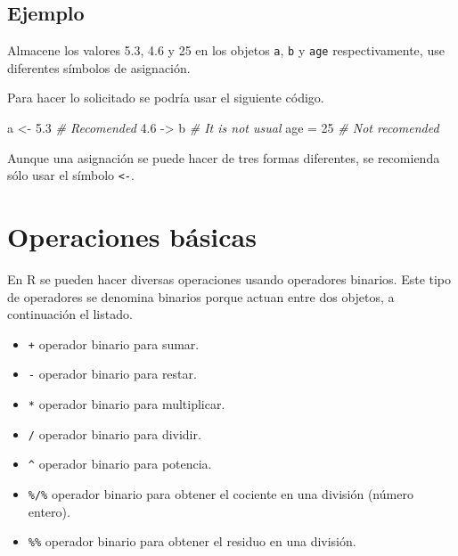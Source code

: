 \documentclass[10pt,]{krantz}
\makeatletter
\newenvironment{Shaded}{\begin{snugshade}}{\end{snugshade}}
\newcommand{\DecValTok}[1]{\textcolor[rgb]{0.00,0.00,0.81}{#1}}
\newcommand{\FloatTok}[1]{\textcolor[rgb]{0.00,0.00,0.81}{#1}}
\newcommand{\StringTok}[1]{\textcolor[rgb]{0.31,0.60,0.02}{#1}}
\newcommand{\CommentTok}[1]{\textcolor[rgb]{0.56,0.35,0.01}{\textit{#1}}}
\newcommand{\NormalTok}[1]{#1}
\providecommand{\tightlist}{%
  \setlength{\itemsep}{0pt}\setlength{\parskip}{0pt}}
\newenvironment{kframe}{%
\medskip{}
\setlength{\fboxsep}{.8em}
 \def\at@end@of@kframe{}%
 \ifinner\ifhmode%
  \def\at@end@of@kframe{\end{minipage}}%
  \begin{minipage}{\columnwidth}%
 \fi\fi%
 \def\FrameCommand##1{\hskip\@totalleftmargin \hskip-\fboxsep
 \colorbox{shadecolor}{##1}\hskip-\fboxsep
     \hskip-\linewidth \hskip-\@totalleftmargin \hskip\columnwidth}%
 \MakeFramed {\advance\hsize-\width
   \@totalleftmargin\z@ \linewidth\hsize
   \@setminipage}}%
 {\par\unskip\endMakeFramed%
 \at@end@of@kframe}
\renewenvironment{Shaded}{\begin{kframe}}{\end{kframe}}
\let\BeginKnitrBlock\begin \let\EndKnitrBlock\end
\makeatother
\begin{document}
\subsection*{Ejemplo}\label{ejemplo-5}


Almacene los valores 5.3, 4.6 y 25 en los objetos \texttt{a}, \texttt{b}
y \texttt{age} respectivamente, use diferentes símbolos de asignación.

Para hacer lo solicitado se podría usar el siguiente código.

\begin{Shaded}
\begin{Highlighting}[]
\NormalTok{a <-}\StringTok{ }\FloatTok{5.3} \CommentTok{# Recomended}
\FloatTok{4.6}\NormalTok{ ->}\StringTok{ }\NormalTok{b }\CommentTok{# It is not usual}
\NormalTok{age =}\StringTok{ }\DecValTok{25} \CommentTok{# Not recomended}
\end{Highlighting}
\end{Shaded}

\BeginKnitrBlock{rmdimportant}
Aunque una asignación se puede hacer de tres formas diferentes, se
recomienda sólo usar el símbolo \texttt{\textless{}-}.
\EndKnitrBlock{rmdimportant}

\section{\texorpdfstring{Operaciones básicas
}{Operaciones básicas }}\label{operaciones-basicas}

En R se pueden hacer diversas operaciones usando operadores binarios.
Este tipo de operadores se denomina binarios porque actuan entre dos
objetos, a continuación el listado.

\begin{itemize}
\tightlist
\item
  \texttt{+} operador binario para sumar.
\item
  \texttt{-} operador binario para restar.
\item
  \texttt{*} operador binario para multiplicar.
\item
  \texttt{/} operador binario para dividir.
\item
  \texttt{\^{}} operador binario para potencia.
\item
  \texttt{\%/\%} operador binario para obtener el cociente en una
  división (número entero).
\item
  \texttt{\%\%} operador binario para obtener el residuo en una
  división.
\end{itemize}
\end{document}
